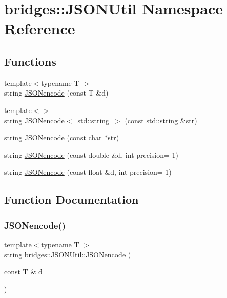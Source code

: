 \hypertarget{namespacebridges_1_1_j_s_o_n_util}{}\section{bridges\+::J\+S\+O\+N\+Util Namespace Reference}
\label{namespacebridges_1_1_j_s_o_n_util}
\subsection*{Functions}
\begin{DoxyCompactItemize}
\item 
{\footnotesize template$<$typename T $>$ }\\string \mbox{\hyperlink{namespacebridges_1_1_j_s_o_n_util_aaf500e70dc1b2a9fd1284e386af1be63}{J\+S\+O\+Nencode}} (const T \&d)
\item 
{\footnotesize template$<$$>$ }\\string \mbox{\hyperlink{namespacebridges_1_1_j_s_o_n_util_a2b258507ccdf822ecebbbbb0b66fb06d}{J\+S\+O\+Nencode$<$ std\+::string $>$}} (const std\+::string \&str)
\item 
string \mbox{\hyperlink{namespacebridges_1_1_j_s_o_n_util_a8167097b34730f71a1b395a76eecd550}{J\+S\+O\+Nencode}} (const char $\ast$str)
\item 
string \mbox{\hyperlink{namespacebridges_1_1_j_s_o_n_util_a3ba781fbae468d93158efbdf3492149c}{J\+S\+O\+Nencode}} (const double \&d, int precision=-\/1)
\item 
string \mbox{\hyperlink{namespacebridges_1_1_j_s_o_n_util_a8372aa47b00ae65edbe27747c98d106a}{J\+S\+O\+Nencode}} (const float \&d, int precision=-\/1)
\end{DoxyCompactItemize}


\subsection{Function Documentation}
\mbox{\label{namespacebridges_1_1_j_s_o_n_util_aaf500e70dc1b2a9fd1284e386af1be63}} 
\subsubsection{\texorpdfstring{JSONencode()}{JSONencode()}\hspace{0.1cm}{\footnotesize\ttfamily [1/4]}}
{\footnotesize\ttfamily template$<$typename T $>$ \\
string bridges\+::\+J\+S\+O\+N\+Util\+::\+J\+S\+O\+Nencode (\begin{DoxyParamCaption}\item[{const T \&}]{d }\end{DoxyParamCaption})\hspace{0.3cm}{\ttfamily [inline]}}


